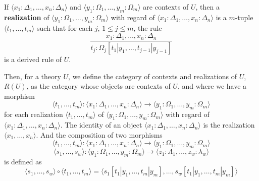 \begin{definition}
    If $\langle x_1 : \Delta_1, \dots, x_n : \Delta_n \rangle$
    and $\langle y_1 : \Omega_1, \dots, y_m : \Omega_m \rangle$
    are contexts of $U$, then a \textbf{realization} of 
    $\langle y_1 : \Omega_1, \dots, y_m : \Omega_m \rangle$
    with regard of $\langle x_1 : \Delta_1, \dots, x_n : \Delta_n \rangle$
    is a $m$-tuple $\langle t_1, \dots, t_m \rangle$
    such that for each $j$, $1 \leq j \leq m$, the rule
    \begin{equation*}
        \dfrac{
            x_1 : \Delta_1, \dots, x_n : \Delta_n
        }{
            t_j : \Omega_j[t_1 | y_1, \dots, t_{j-1} | y_{j-1}]
        }
    \end{equation*}
    is a derived rule of $U$.
\end{definition}

Then, for a theory $U$, we define the category of contexts and realizations of $U$,
$R(U)$, as the category whose objects are contexts of $U$,
and where we have a morphism 
\begin{equation*}
    \langle t_1, \dots, t_m \rangle : 
    \langle x_1 : \Delta_1, \dots, x_n : \Delta_n \rangle 
    \longrightarrow 
    \langle y_1 : \Omega_1, \dots, y_m : \Omega_m \rangle
\end{equation*}
for each realization $\langle t_1, \dots, t_m \rangle$
of $\langle y_1 : \Omega_1, \dots, y_m : \Omega_m \rangle$
with regard of $\langle x_1 : \Delta_1, \dots, x_n : \Delta_n \rangle$.
The identity of an object $\langle x_1 : \Delta_1, \dots, x_n : \Delta_n \rangle$
is the realization $\langle x_1, \dots, x_n \rangle$.
And the composition of two morphisms
\begin{equation*}
    \langle t_1, \dots, t_m \rangle : 
    \langle x_1 : \Delta_1, \dots, x_n : \Delta_n \rangle 
    \longrightarrow 
    \langle y_1 : \Omega_1, \dots, y_m : \Omega_m \rangle
\end{equation*}
\begin{equation*}
    \langle s_1, \dots, s_w \rangle : 
    \langle y_1 : \Omega_1, \dots, y_m : \Omega_m \rangle
    \longrightarrow
    \langle z_1 : \Lambda_1, \dots, z_w : \lambda_w \rangle
\end{equation*}
is defined as
\begin{equation*}
    \langle s_1, \dots, s_w \rangle \circ \langle t_1, \dots, t_m \rangle =
    \langle s_1[t_1 | y_1, \dots, t_m | y_m], \dots, s_w[t_1 | y_1, \dots, t_m | y_m] \rangle
\end{equation*}
 
